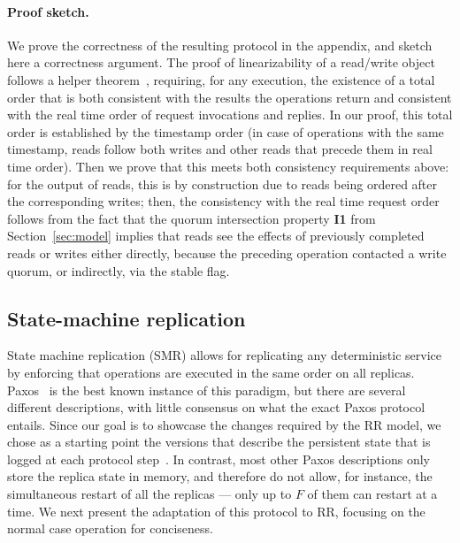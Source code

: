 
\paragraph{Proof sketch.}
We prove the correctness of the resulting protocol in the
appendix, and sketch here a correctness argument. The proof of
linearizability of a read/write object follows a helper
theorem~\cite{nancy-book}, requiring, for any execution, the
existence of a total order that is both consistent with the
results the operations return and consistent with the real time
order of request invocations and replies. In our proof, this
total order is established by the timestamp order (in case of
operations with the same timestamp, reads follow both writes and
other reads that precede them in real time order).  Then we prove
that this meets both consistency requirements above: for the
output of reads, this is by construction due to reads being
ordered after the corresponding writes; then,
the consistency with the real time request order follows from the
fact that the quorum intersection property \textbf{I1} from
Section~\ref{sec:model} implies that reads see the effects of
previously completed reads or writes either directly, because the
preceding operation contacted a write quorum, or indirectly, via
the stable flag.


\subsection{State-machine replication}\label{ssec:paxos}

State machine replication (SMR) allows for replicating any
deterministic service by enforcing that operations are executed in the
same order on all replicas. Paxos~\cite{paxos} is the best known
instance of this paradigm, but there are several different
descriptions, with little consensus on what the exact Paxos protocol
entails.  Since our goal is to showcase the changes required by the
\ac{RR} model, we chose as a starting point the versions that
describe the persistent state that is logged at each protocol
step~\cite{paxos_builders,paxos_engineering}. In contrast, most other
Paxos descriptions only store the replica state in memory, and therefore
do not allow, for instance, the simultaneous restart of all the
replicas --- only up to $F$ of them can restart at a time. We next
present the adaptation of this protocol to \ac{RR}, focusing on
the normal case operation for conciseness.


